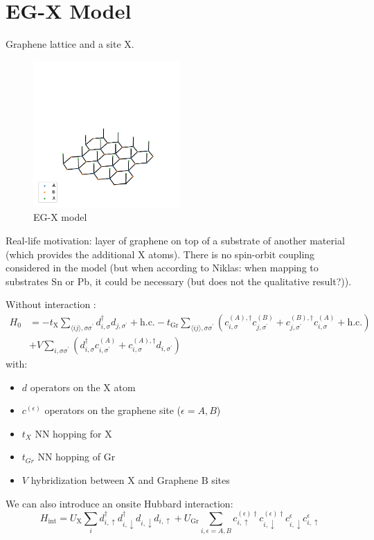 \documentclass[../notes.tex]{subfiles}
\begin{document}
\section{EG-X Model}\label{sec:eg-x-model}

Graphene lattice and a site X\@.
\begin{figure}[htb]
	\centering
	\includegraphics[width=0.5\textwidth]{images/eg-x lattice}
	\caption{EG-X model}
	\label{fig:eg-x model}
\end{figure}
Real-life motivation: layer of graphene on top of a substrate of another material (which provides the additional X atoms).
There is no spin-orbit coupling considered in the model (but when according to Niklas: when mapping to substrates Sn or Pb, it could be necessary (but does not the qualitative result?)).

Without interaction :
\begin{align}
	H_0 &= -t_{\mathrm{X}} \sum_{\langle ij \rangle, \sigma \sigma^{\prime}} d_{i, \sigma}^{\dagger} d_{j, \sigma^{\prime}} + \mathrm{h.c.}
	-t_{\mathrm{Gr}} \sum_{\langle ij \rangle, \sigma \sigma^{\prime}} \left(
	c_{i, \sigma}^{(A), \dagger} c_{j, \sigma^{\prime}}^{(B)} +
	c_{j, \sigma^{\prime}}^{(B), \dagger} c_{i, \sigma}^{(A)} + \mathrm{h.c.}
	\right) \\
	&+ V \sum_{i, \sigma \sigma^{\prime}} \left(
	d_{i, \sigma}^{\dagger} c_{i, \sigma^{\prime}}^{(A)} +
	c_{i, \sigma}^{(A), \dagger} d_{i, \sigma^{\prime}}
	\right)
	\label{eq:EG-X model Hamiltonian non-interacting}
\end{align}
with:
\begin{itemize}
	\item \(d\) operators on the X atom
	\item \(c^{(\epsilon)}\) operators on the graphene site (\(\epsilon = A, B\))
	\item \(t_X\) NN hopping for X
	\item \(t_{Gr}\) NN hopping of Gr
	\item \(V\) hybridization between \(\mathrm{X}\) and Graphene \(\mathrm{B}\) sites
\end{itemize}
We can also introduce an onsite Hubbard interaction:
\begin{equation}
	H_{\mathrm{int}} = U_{\mathrm{X}} \sum_{i} d_{i, \uparrow}^{\dagger} d_{i, \downarrow}^{\dagger} d_{i, \downarrow} d_{i, \uparrow}
	+ U_{\mathrm{Gr}} \sum_{i, \epsilon=A, B} c_{i, \uparrow}^{(\epsilon) \dagger} c_{i, \downarrow}^{(\epsilon) \dagger} c_{i, \downarrow}^{\epsilon} c_{i, \uparrow}^{\epsilon}
\end{equation}
\end{document}
